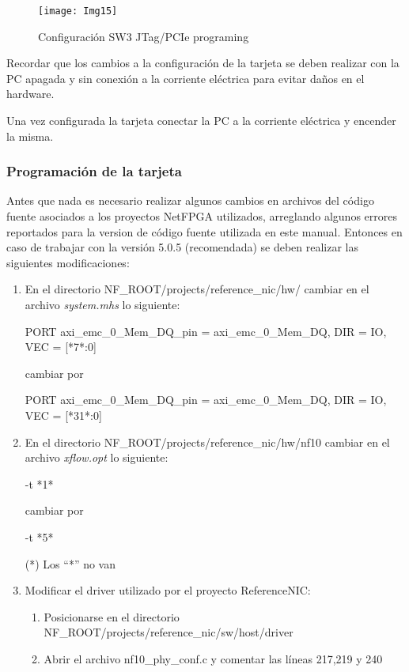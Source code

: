 \begin{figure}[htbp!] 
\centering    
\texttt{[image: Img15]}
\caption[Configuración SW3 JTag/PCIe programing]{Configuración SW3 JTag/PCIe programing}
\label{fig:Img15}
\end{figure}

Recordar que los cambios a la configuración de la tarjeta se deben realizar con la PC apagada y sin conexión a la corriente eléctrica para evitar daños en el hardware.

Una vez configurada la tarjeta conectar la PC a la corriente eléctrica y encender la misma.

\subsubsection{Programación de la tarjeta}
Antes que nada es necesario realizar algunos cambios en archivos del código fuente asociados a los proyectos NetFPGA utilizados, arreglando algunos errores reportados para la version de código fuente utilizada en este manual. Entonces en caso de trabajar con la versión 5.0.5 (recomendada) se deben realizar las siguientes modificaciones:

\begin{enumerate}

\item En el directorio NF\_ROOT/projects/reference\_nic/hw/ cambiar en el archivo \textit{system.mhs} lo siguiente:

\begin{bash}
PORT axi_emc_0_Mem_DQ_pin = axi_emc_0_Mem_DQ, DIR = IO, 
VEC = [*7*:0]
\end{bash}

cambiar por

\begin{bash}
PORT axi_emc_0_Mem_DQ_pin = axi_emc_0_Mem_DQ, DIR = IO, 
VEC = [*31*:0]
\end{bash}

\item En el directorio NF\_ROOT/projects/reference\_nic/hw/nf10 cambiar en el archivo \textit{xflow.opt} lo siguiente: 

\begin{bash}
-t *1*
\end{bash}

cambiar por

\begin{bash}
-t *5*
\end{bash}

(*) Los “*” no van

\item Modificar el driver utilizado por el proyecto ReferenceNIC:
\begin{enumerate}
\item Posicionarse en el directorio NF\_ROOT/projects/reference\_nic/sw/host/driver
\item Abrir el archivo nf10\_phy\_conf.c y comentar las líneas 217,219 y 240
\end{enumerate}

\end{enumerate}


